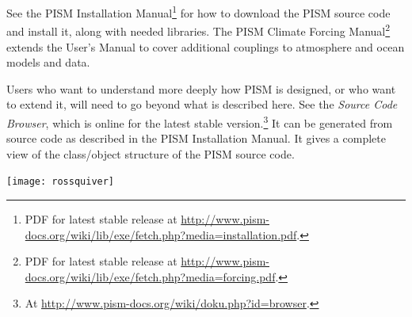 \documentclass[titlepage,letterpaper,final]{scrartcl}
\begin{document}
See the PISM Installation Manual\footnote{PDF for latest stable release at \url{http://www.pism-docs.org/wiki/lib/exe/fetch.php?media=installation.pdf}.}
for how to download the PISM source code and install
it, along with needed libraries.  The PISM Climate Forcing
Manual\footnote{PDF for latest stable release at \url{http://www.pism-docs.org/wiki/lib/exe/fetch.php?media=forcing.pdf}.}
extends the User's Manual to cover additional couplings to atmosphere and ocean
models and data.

Users who want to understand more deeply how PISM is designed, or who want to extend it,  will need to go beyond what is described here.  See the \emph{Source Code Browser}, which is online for the latest stable version.\footnote{At \url{http://www.pism-docs.org/wiki/doku.php?id=browser}.}  It can be generated from source code as described in the PISM Installation Manual.  It gives a complete view of the class/object structure of the PISM source code.


\vspace{.3in}
  
\begin{center}
\texttt{[image: rossquiver]}
\end{center}

\vspace{.2in}

\begin{center}
\end{center}


\clearpage\newpage


\clearpage\newpage


\clearpage\newpage


\clearpage\newpage


\clearpage\newpage


\clearpage\newpage


\clearpage\newpage

\end{document}
